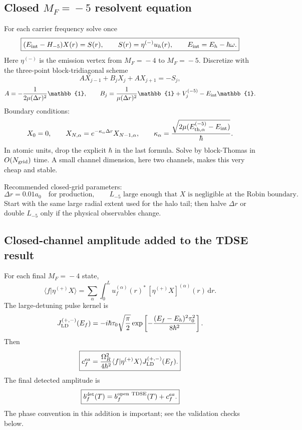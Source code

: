 \documentclass[11pt,a4paper]{article}
\newcommand{\MF}[1]{M_F\!=\!#1}
\newcommand{\dd}{\,\mathrm d}
\newcommand{\one}{\mathbb{1}}
\begin{document}
\subsection{Closed $\MF{-5}$ resolvent equation}

For each carrier frequency solve once
\begin{equation}
\boxed{(E_{\rm int}-H_{-5})X(r)=S(r),
\qquad S(r)=\eta^{(-)}u_h(r),
\qquad E_{\rm int}=E_h-\hbar\omega.}
\end{equation}
Here $\eta^{(-)}$ is the emission vertex from $\MF{-4}$ to $\MF{-5}$.  Discretize
with the three-point block-tridiagonal scheme
\begin{equation}
A X_{j-1}+B_jX_j+A X_{j+1}=-S_j,
\end{equation}
\begin{equation}
A=-\frac{1}{2\mu(\Delta r)^2}\one,
\qquad
B_j=\frac{1}{\mu(\Delta r)^2}\one+V_j^{(-5)}-E_{\rm int}\one.
\end{equation}
Boundary conditions:
\begin{equation}
X_0=0,
\qquad
X_{N,\alpha}=e^{-\kappa_\alpha\Delta r}X_{N-1,\alpha},
\qquad
\kappa_\alpha=\frac{\sqrt{2\mu(E_{{\rm th},\alpha}^{(-5)}-E_{\rm int})}}{\hbar}.
\end{equation}
In atomic units, drop the explicit $\hbar$ in the last formula.  Solve by
block-Thomas in $O(N_{\rm grid})$ time.  A small channel dimension, here two
channels, makes this very cheap and stable.

Recommended closed-grid parameters:
\begin{equation}
\Delta r=0.01a_0\quad\text{for production},
\qquad
L_{-5}\text{ large enough that }X\text{ is negligible at the Robin boundary}.
\end{equation}
Start with the same large radial extent used for the halo tail; then halve
$\Delta r$ or double $L_{-5}$ only if the physical observables change.

\subsection{Closed-channel amplitude added to the TDSE result}

For each final $\MF{-4}$ state,
\begin{equation}
\langle f|\eta^{(+)}X\rangle=
\sum_\alpha\int_0^L u_f^{(\alpha)}(r)^*\,[\eta^{(+)}X]^{(\alpha)}(r)\dd r.
\end{equation}
The large-detuning pulse kernel is
\begin{equation}
J^{(+,-)}_{\rm LD}(E_f)=
-i\hbar\tau_0\sqrt{\frac{\pi}{2}}
\exp\left[-\frac{(E_f-E_h)^2\tau_0^2}{8\hbar^2}\right].
\end{equation}
Then
\begin{equation}
\boxed{c_f^{ea}=\frac{\Omega_R^2}{4\hbar^2}
\langle f|\eta^{(+)}X\rangle J^{(+,-)}_{\rm LD}(E_f).}
\end{equation}
The final detected amplitude is
\begin{equation}
\boxed{b_f^{\rm det}(T)=b_f^{\rm open\ TDSE}(T)+c_f^{ea}.}
\end{equation}
The phase convention in this addition is important; see the validation checks below.
\end{document}
